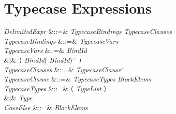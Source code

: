 %
%
%
%

\section{Typecase Expressions}


\begin{Grammar}
\emph{DelimitedExpr}
&::=&  \emph{TypecaseBindings} 
\emph{TypecaseClauses}  \\

\emph{TypecaseBindings} &::=& \emph{TypecaseVars}
\\

\emph{TypecaseVars} &::=& \emph{BindId} \\
&$|$& \texttt{(} \emph{BindId}(\EXP{,} \emph{BindId})$^+$ \texttt{)} \\

\emph{TypecaseClauses} &::=& \emph{TypecaseClause}$^+$\\

\emph{TypecaseClause} &::=&
\emph{TypecaseTypes} \EXP{\Rightarrow} \emph{BlockElems} \\

\emph{TypecaseTypes}
&::=& \texttt{(} \emph{TypeList} \texttt{)}\\
&$|$& \emph{Type} \\

\emph{CaseElse} &::=&  \EXP{\Rightarrow} \emph{BlockElems}\\

\end{Grammar}

